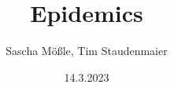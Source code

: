 \documentclass[oneside]{ausarbeitung}
\begin{document}

\Projektbericht

\Informatik

\title{Epidemics}

\author{Sascha Mößle, Tim Staudenmaier}

\examinerIsAProfessortrue   %


\date{14.3.2023}



\maketitle
\cleardoublepage

\setcounter{page}{1}


\makeaffirmation
\cleardoublepage
\end{document}
